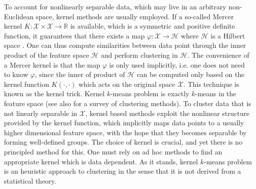 \documentclass[aps,preprint,nofootinbib,floatfix]{revtex4-1}
\newcommand\kk{K}
\begin{document}
To account for nonlinearly separable data, which may live
in an arbitrary non-Euclidean space, kernel methods are usually employed.
If a so-called Mercer kernel $\kk: \mathcal{X}\times \mathcal{X} \to \mathbb{R}$
is available, which is a symmetric and positive definite 
function, it guarantees that there exists a map $\varphi : \mathcal{X} \to
\mathcal{H}$ where $\mathcal{H}$ is a Hilbert space \cite{Mercer}. 
One can thus
compute similarities between data point through the inner product of
the feature space $\mathcal{H}$ and 
perform clustering in $\mathcal{H}$. The convenience of a Mercer
kernel is that the map $\varphi$ is only used implicitly, i.e. one
does not need to know $\varphi$, since the inner
of product of $\mathcal{H}$ can be computed only 
based on the kernel function $\kk(\cdot, \cdot)$ which acts on the original
space $\mathcal{X}$. 
This technique is known as the kernel trick.  
Kernel $k$-means problem 
is exactly $k$-means in the feature space
\cite{Smola,Girolami} (see also \cite{Filippone} for a survey of clustering
methods).
To cluster data that is not linearly
separable in $\mathcal{X}$,
kernel based methods exploit the nonlinear structure provided by
the kernel function, which implicitly maps data points to a usually higher
dimensional feature 
space, with the hope that they becomes separable by 
forming well-defined groups.
The choice of
kernel is crucial, and yet there is no principled method
for this. One must rely on ad hoc methods to find an appropriate kernel
which is data dependent.
As it stands, kernel $k$-means problem is an heuristic approach to clustering
in the sense that it is not derived from a statistical theory. 
\end{document}
